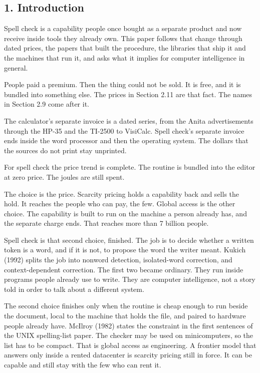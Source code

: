 \documentclass[
  10pt,
]{article}
\begin{document}
\subsection{1. Introduction}\label{introduction}

Spell check is a capability people once bought as a separate product and
now receive inside tools they already own. This paper follows that
change through dated prices, the papers that built the procedure, the
libraries that ship it and the machines that run it, and asks what it
implies for computer intelligence in general.

People paid a premium. Then the thing could not be sold. It is free, and
it is bundled into something else. The prices in Section 2.11 are that
fact. The names in Section 2.9 come after it.

The calculator's separate invoice is a dated series, from the Anita
advertisements through the HP-35 and the TI-2500 to VisiCalc. Spell
check's separate invoice ends inside the word processor and then the
operating system. The dollars that the sources do not print stay
unprinted.

For spell check the price trend is complete. The routine is bundled into
the editor at zero price. The joules are still spent.

The choice is the price. Scarcity pricing holds a capability back and
sells the hold. It reaches the people who can pay, the few. Global
access is the other choice. The capability is built to run on the
machine a person already has, and the separate charge ends. That reaches
more than 7 billion people.

Spell check is that second choice, finished. The job is to decide
whether a written token is a word, and if it is not, to propose the word
the writer meant. Kukich (1992) splits the job into nonword detection,
isolated-word correction, and context-dependent correction. The first
two became ordinary. They run inside programs people already use to
write. They are computer intelligence, not a story told in order to talk
about a different system.

The second choice finishes only when the routine is cheap enough to run
beside the document, local to the machine that holds the file, and
paired to hardware people already have. McIlroy (1982) states the
constraint in the first sentences of the UNIX spelling-list paper. The
checker may be used on minicomputers, so the list has to be compact.
That is global access as engineering. A frontier model that answers only
inside a rented datacenter is scarcity pricing still in force. It can be
capable and still stay with the few who can rent it.
\end{document}
